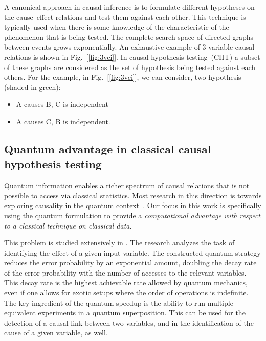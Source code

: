 \documentclass[
 aps,
 jmp,
 amsmath,amssymb,
 reprint,
]{revtex4-2}
\begin{document}
A canonical approach in causal inference is to formulate different hypotheses on the cause–effect relations and test them against each other.
This technique is typically used when there is some knowledge of the characteristic of the phenomenon that is being tested.
The complete search-space of directed graphs between events grows exponentially.
An exhaustive example of 3 variable causal relations is shown in Fig.~[\ref{fig:3vci}].
In causal hypothesis testing~(CHT) a subset of these graphs are considered as the set of hypothesis being tested against each others.
For the example, in Fig.~[\ref{fig:3vci}], we can consider, two hypothesis (shaded in green):
\begin{itemize} %
	\item A causes B, C is independent
	\item A causes C, B is independent.
\end{itemize}

\subsection{Quantum advantage in classical causal hypothesis testing}

Quantum information enables a richer spectrum of causal relations that is not possible to access via classical statistics.
Most research in this direction is towards exploring causality in the quantum context~\cite{costa2016quantum,giarmatzi2019quantum,javidian2021quantum,bai2021quantum,bai2020efficient,bavaresco2021strict}.
Our focus in this work is specifically using the quantum formulation to provide a \textit{computational advantage with respect to a classical technique on classical data}.

This problem is studied extensively in \cite{chiribella2019quantum}.
The research analyzes the task of identifying the effect of a given input variable.
The constructed quantum strategy reduces the error probability by an exponential amount, doubling the decay rate of the error probability with the number of accesses to the relevant variables. 
This decay rate is the highest achievable rate allowed by quantum mechanics, even if one allows for exotic setups where the order of operations is indefinite.
The key ingredient of the quantum speedup is the ability to run multiple equivalent experiments in a quantum superposition.
This can be used for the detection of a causal link between two variables, and in the identification of the cause of a given variable, as well.
\end{document}
